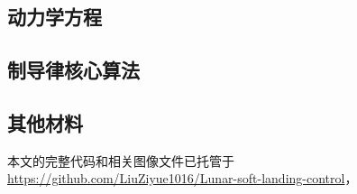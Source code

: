 \documentclass[12pt,a4paper]{article}
\begin{document}
\subsection*{动力学方程}


\subsection*{制导律核心算法}


\subsection*{其他材料}
本文的完整代码和相关图像文件已托管于
\url{https://github.com/LiuZiyue1016/Lunar-soft-landing-control}，
\end{document}

